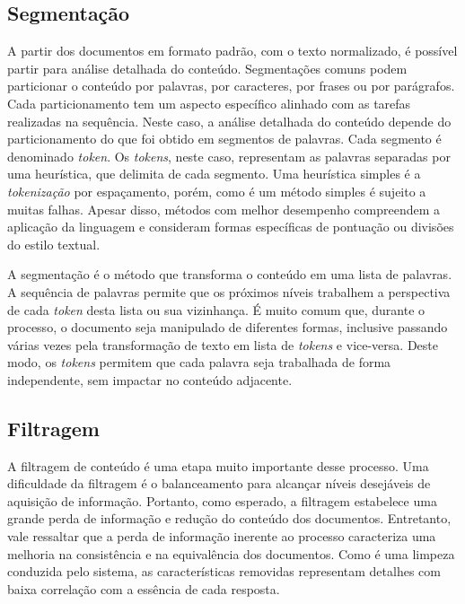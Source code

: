 \subsection{Segmentação}
\label{subsec-segmentacao}

A partir dos documentos em formato padrão, com o texto normalizado, é possível partir para análise detalhada do conteúdo. Segmentações comuns podem particionar o conteúdo por palavras, por caracteres, por frases ou por parágrafos. Cada particionamento tem um aspecto específico alinhado com as tarefas realizadas na sequência. Neste caso, a análise detalhada do conteúdo depende do particionamento do que foi obtido em segmentos de palavras. Cada segmento é denominado \textit{token}. Os \textit{tokens}, neste caso, representam as palavras separadas por uma heurística, que delimita de cada segmento. Uma heurística simples é a \textit{tokenização} por espaçamento, porém, como é um método simples é sujeito a muitas falhas. Apesar disso, métodos com melhor desempenho compreendem a aplicação da linguagem e consideram formas específicas de pontuação ou divisões do estilo textual.

A segmentação é o método que transforma o conteúdo em uma lista de palavras. A sequência de palavras permite que os próximos níveis trabalhem a perspectiva de cada \textit{token} desta lista ou sua vizinhança. É muito comum que, durante o processo, o documento seja manipulado de diferentes formas, inclusive passando várias vezes pela transformação de texto em lista de \textit{tokens} e vice-versa. Deste modo, os \textit{tokens} permitem que cada palavra seja trabalhada de forma independente, sem impactar no conteúdo adjacente.

\subsection{Filtragem}
\label{subsec-filtragem}
A filtragem de conteúdo é uma etapa muito importante desse processo. Uma dificuldade da filtragem é o balanceamento para alcançar níveis desejáveis de aquisição de informação. Portanto, como esperado, a filtragem estabelece uma grande perda de informação e redução do conteúdo dos documentos. Entretanto, vale ressaltar que a perda de informação inerente ao processo caracteriza uma melhoria na consistência e na equivalência dos documentos. Como é uma limpeza conduzida pelo sistema, as características removidas representam detalhes com baixa correlação com a essência de cada resposta.

